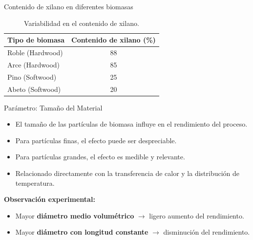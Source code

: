 \documentclass[main.tex]{subfiles}
\begin{document}
\begin{frame}{Contenido de xilano en diferentes biomasas}
\centering
\begin{table}
\caption{Variabilidad en el contenido de xilano.}
\begin{tabular}{lc}
  \toprule
  \textbf{Tipo de biomasa} & \textbf{Contenido de xilano (\%)} \\
  \midrule
  Roble (Hardwood) & 88 \\
  Arce (Hardwood) & 85 \\
  Pino (Softwood) & 25 \\
  Abeto (Softwood) & 20 \\
  \bottomrule
\end{tabular}
\end{table}
\end{frame}

\begin{frame}{Parámetro: Tamaño del Material}
\begin{itemize}
  \item El tamaño de las partículas de biomasa influye en el rendimiento del proceso.
  \item Para partículas finas, el efecto puede ser despreciable.
  \item Para partículas grandes, el efecto es medible y relevante.
  \item Relacionado directamente con la transferencia de calor y la distribución de temperatura.
\end{itemize}
\vspace{0.5em}
\textbf{Observación experimental:}
\begin{itemize}
  \item Mayor \textbf{diámetro medio volumétrico} $\rightarrow$ ligero aumento del rendimiento.
  \item Mayor \textbf{diámetro con longitud constante} $\rightarrow$ disminución del rendimiento.
\end{itemize}
\end{frame}
\end{document}
